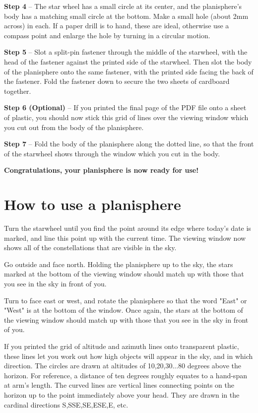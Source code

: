 \documentclass[a4paper,onecolumn,10pt]{article}
\begin{document}
{\bf Step 4} -- The star wheel has a small circle at its center, and the
planisphere's body has a matching small circle at the bottom. Make a small hole
(about 2mm across) in each. If a paper drill is to hand, these are ideal,
otherwise use a compass point and enlarge the hole by turning in a circular
motion.

{\bf Step 5} -- Slot a split-pin fastener through the middle of the
starwheel, with the head of the fastener against the printed side of the
starwheel. Then slot the body of the planisphere onto the same fastener, with
the printed side facing the back of the fastener. Fold the fastener down to
secure the two sheets of cardboard together.

{\bf Step 6 (Optional)} -- If you printed the final page of the PDF file
onto a sheet of plastic, you should now stick this grid of lines over the
viewing window which you cut out from the body of the planisphere.

{\bf Step 7} -- Fold the body of the planisphere along the dotted line,
so that the front of the starwheel shows through the window which you cut in
the body.

{\bf Congratulations, your planisphere is now ready for use!}

\section*{How to use a planisphere}

Turn the starwheel until you find the point around its edge where today's date
is marked, and line this point up with the current time. The viewing window now
shows all of the constellations that are visible in the sky.

Go outside and face north. Holding the planisphere up to the sky, the stars
marked at the bottom of the viewing window should match up with those that you
see in the sky in front of you.

Turn to face east or west, and rotate the planisphere so that the word "East"
or "West" is at the bottom of the window. Once again, the stars at the bottom
of the viewing window should match up with those that you see in the sky in
front of you.

If you printed the grid of altitude and azimuth lines onto transparent plastic,
these lines let you work out how high objects will appear in the sky, and in
which direction. The circles are drawn at altitudes of 10,20,30...80 degrees
above the horizon. For reference, a distance of ten degrees roughly equates to
a hand-span at arm's length. The curved lines are vertical lines connecting
points on the horizon up to the point immediately above your head. They are
drawn in the cardinal directions S,SSE,SE,ESE,E, etc.
\end{document}
